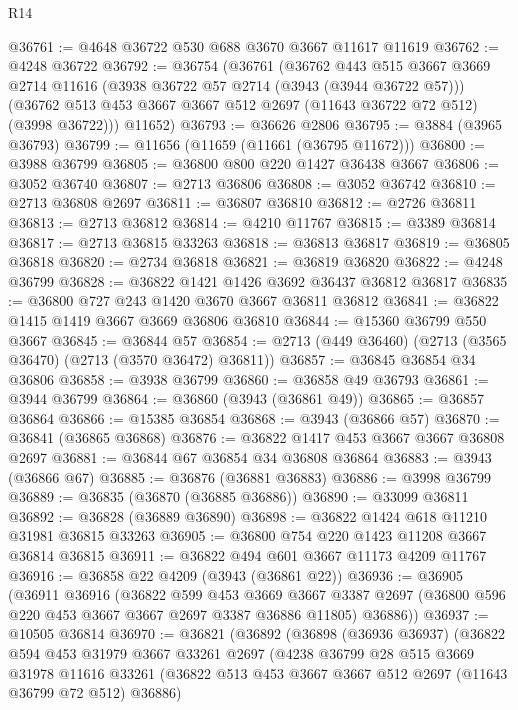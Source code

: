 \begin{lexlean}{R14}
\begin{coremodule}
@36761 := @4648 @36722 @530 @688 @3670 @3667 @11617 @11619
@36762 := @4248 @36722
@36792 := @36754
    (@36761
      (@36762
        @443
        @515
        @3667
        @3669
        @2714
        @11616
        (@3938 @36722 @57 @2714 (@3943 (@3944 @36722 @57)))
        (@36762 @513 @453 @3667 @3667 @512 @2697 (@11643 @36722 @72 @512) (@3998 @36722)))
      @11652)
@36793 := @36626 @2806
@36795 := @3884 (@3965 @36793)
@36799 := @11656 (@11659 (@11661 (@36795 @11672)))
@36800 := @3988 @36799
@36805 := @36800 @800 @220 @1427 @36438 @3667
@36806 := @3052 @36740
@36807 := @2713 @36806
@36808 := @3052 @36742
@36810 := @2713 @36808 @2697
@36811 := @36807 @36810
@36812 := @2726 @36811
@36813 := @2713 @36812
@36814 := @4210 @11767
@36815 := @3389 @36814
@36817 := @2713 @36815 @33263
@36818 := @36813 @36817
@36819 := @36805 @36818
@36820 := @2734 @36818
@36821 := @36819 @36820
@36822 := @4248 @36799
@36828 := @36822 @1421 @1426 @3692 @36437 @36812 @36817
@36835 := @36800 @727 @243 @1420 @3670 @3667 @36811 @36812
@36841 := @36822 @1415 @1419 @3667 @3669 @36806 @36810
@36844 := @15360 @36799 @550 @3667
@36845 := @36844 @57
@36854 := @2713 (@449 @36460) (@2713 (@3565 @36470) (@2713 (@3570 @36472) @36811))
@36857 := @36845 @36854 @34 @36806
@36858 := @3938 @36799
@36860 := @36858 @49 @36793
@36861 := @3944 @36799
@36864 := @36860 (@3943 (@36861 @49))
@36865 := @36857 @36864
@36866 := @15385 @36854
@36868 := @3943 (@36866 @57)
@36870 := @36841 (@36865 @36868)
@36876 := @36822 @1417 @453 @3667 @3667 @36808 @2697
@36881 := @36844 @67 @36854 @34 @36808 @36864
@36883 := @3943 (@36866 @67)
@36885 := @36876 (@36881 @36883)
@36886 := @3998 @36799
@36889 := @36835 (@36870 (@36885 @36886))
@36890 := @33099 @36811
@36892 := @36828 (@36889 @36890)
@36898 := @36822 @1424 @618 @11210 @31981 @36815 @33263
@36905 := @36800 @754 @220 @1423 @11208 @3667 @36814 @36815
@36911 := @36822 @494 @601 @3667 @11173 @4209 @11767
@36916 := @36858 @22 @4209 (@3943 (@36861 @22))
@36936 := @36905
    (@36911
      @36916
      (@36822
        @599
        @453
        @3669
        @3667
        @3387
        @2697
        (@36800 @596 @220 @453 @3667 @3667 @2697 @3387 @36886 @11805)
        @36886))
@36937 := @10505 @36814
@36970 := @36821
    (@36892
      (@36898
        (@36936 @36937)
        (@36822
          @594
          @453
          @31979
          @3667
          @33261
          @2697
          (@4238
            @36799
            @28
            @515
            @3669
            @31978
            @11616
            @33261
            (@36822 @513 @453 @3667 @3667 @512 @2697 (@11643 @36799 @72 @512) @36886)

\end{coremodule}
\end{lexlean}
